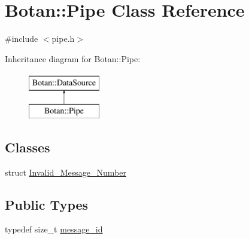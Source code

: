 \hypertarget{classBotan_1_1Pipe}{\section{Botan\-:\-:Pipe Class Reference}
\label{classBotan_1_1Pipe}
}


{\ttfamily \#include $<$pipe.\-h$>$}

Inheritance diagram for Botan\-:\-:Pipe\-:\begin{figure}[H]
\begin{center}
\leavevmode
\includegraphics[height=2.000000cm]{classBotan_1_1Pipe}
\end{center}
\end{figure}
\subsection*{Classes}
\begin{DoxyCompactItemize}
\item 
struct \hyperlink{structBotan_1_1Pipe_1_1Invalid__Message__Number}{Invalid\-\_\-\-Message\-\_\-\-Number}
\end{DoxyCompactItemize}
\subsection*{Public Types}
\begin{DoxyCompactItemize}
\item 
typedef size\-\_\-t \hyperlink{classBotan_1_1Pipe_a122c19120c1c21f270b6b6225ca9883c}{message\-\_\-id}
\end{DoxyCompactItemize}
